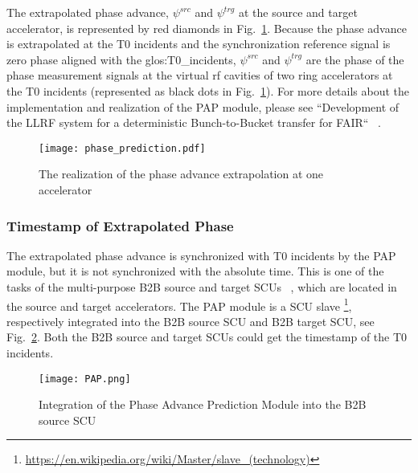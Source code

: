 The extrapolated phase advance, $\psi^\mathit{src}$ and $\psi^\mathit{trg}$ at the source and target accelerator, is represented by red diamonds in Fig.~\ref{phase_prediction1}. Because the phase advance is extrapolated at the T0 incidents and the synchronization reference signal is zero phase aligned with the \gls{glos:T0_incidents}, $\psi^\mathit{src}$ and $\psi^\mathit{trg}$ are the phase of the phase measurement signals at the virtual rf cavities of two ring accelerators at the T0 incidents (represented as black dots in Fig.~\ref{phase_prediction1}). For more details about the implementation and realization of the PAP module, please see ``Development of the LLRF system for a deterministic Bunch-to-Bucket transfer for FAIR`` ~\cite{ferrand_development_nodate}.   
\begin{figure}[!htb]
   \centering   
   \texttt{[image: phase\_prediction.pdf]}
   \caption{The realization of the phase advance extrapolation at one accelerator}
   \label{phase_prediction1}
\end{figure}
\subsubsection{Timestamp of Extrapolated Phase}
The extrapolated phase advance is synchronized with T0 incidents by the PAP module, but it is not synchronized with the absolute time. This is one of the tasks of the multi-purpose B2B source and target SCUs ~\cite{beck_new_2012, thieme_scu_2013}, which are located in the source and target accelerators. The PAP module is a SCU slave \footnote{\url{https://en.wikipedia.org/wiki/Master/slave_(technology)}}, respectively integrated into the B2B source SCU and B2B target SCU, see Fig.~\ref{PAP}. Both the B2B source and target SCUs could get the timestamp of the T0 incidents. 
 \begin{figure}[!htb]
   \centering   
   \texttt{[image: PAP.png]}
   \caption{Integration of the Phase Advance Prediction Module into the B2B source SCU}
   \label{PAP}
\end{figure}

